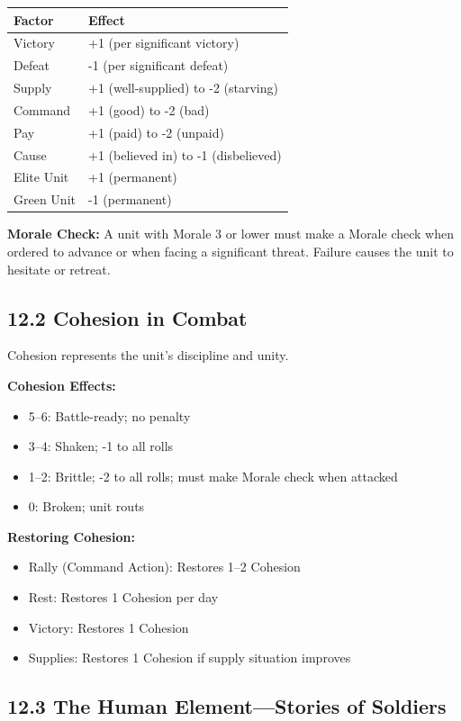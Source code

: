 \documentclass[11pt]{article}
\begin{document}
\begin{tabular}{|l|l|}
\hline
Factor & Effect \\
\hline
Victory & +1 (per significant victory) \\
\hline
Defeat & -1 (per significant defeat) \\
\hline
Supply & +1 (well-supplied) to -2 (starving) \\
\hline
Command & +1 (good) to -2 (bad) \\
\hline
Pay & +1 (paid) to -2 (unpaid) \\
\hline
Cause & +1 (believed in) to -1 (disbelieved) \\
\hline
Elite Unit & +1 (permanent) \\
\hline
Green Unit & -1 (permanent) \\
\hline
\end{tabular}

\textbf{Morale Check:} A unit with Morale 3 or lower must make a Morale check when ordered to advance or when facing a significant threat. Failure causes the unit to hesitate or retreat.

\subsection{12.2 Cohesion in Combat}

Cohesion represents the unit's discipline and unity.

\textbf{Cohesion Effects:}
\begin{itemize}
  \item 5–6: Battle-ready; no penalty
  \item 3–4: Shaken; -1 to all rolls
  \item 1–2: Brittle; -2 to all rolls; must make Morale check when attacked
  \item 0: Broken; unit routs
\end{itemize}

\textbf{Restoring Cohesion:}
\begin{itemize}
  \item Rally (Command Action): Restores 1–2 Cohesion
  \item Rest: Restores 1 Cohesion per day
  \item Victory: Restores 1 Cohesion
  \item Supplies: Restores 1 Cohesion if supply situation improves
\end{itemize}

\subsection{12.3 The Human Element—Stories of Soldiers}
\end{document}
